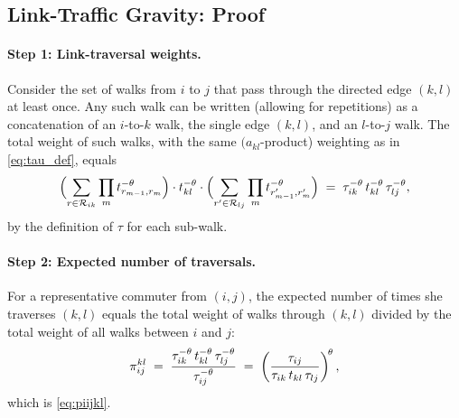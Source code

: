 \subsection{Link-Traffic Gravity: Proof}\label{app:linkgravity}

\paragraph{Step 1: Link-traversal weights.}
Consider the set of walks from $i$ to $j$ that pass through the
directed edge $(k,l)$ at least once.  Any such walk can be written
(allowing for repetitions) as a concatenation of an $i$-to-$k$ walk,
the single edge $(k,l)$, and an $l$-to-$j$ walk.  The total weight of
such walks, with the same $(a_{kl}$-product) weighting as in
\eqref{eq:tau_def}, equals
\[
  \Bigl(\sum_{r\in\mathcal R_{ik}}\prod_{m}t_{r_{m-1},r_m}^{-\theta}\Bigr)\cdot
  t_{kl}^{-\theta}\cdot
  \Bigl(\sum_{r'\in\mathcal R_{lj}}\prod_{m}t_{r'_{m-1},r'_m}^{-\theta}\Bigr)
  \;=\;\tau_{ik}^{-\theta}\,t_{kl}^{-\theta}\,\tau_{lj}^{-\theta},
\]
by the definition of $\tau$ for each sub-walk.

\paragraph{Step 2: Expected number of traversals.}
For a representative commuter from $(i,j)$, the expected number of
times she traverses $(k,l)$ equals the total weight of walks through
$(k,l)$ divided by the total weight of all walks between $i$ and $j$:
\begin{equation}
  \pi^{kl}_{ij}
  \;=\;\frac{\tau_{ik}^{-\theta}\,t_{kl}^{-\theta}\,\tau_{lj}^{-\theta}}
            {\tau_{ij}^{-\theta}}
  \;=\;\left(\frac{\tau_{ij}}{\tau_{ik}\,t_{kl}\,\tau_{lj}}\right)^{\!\theta},
  \label{eq:piijkl_app}
\end{equation}
which is \eqref{eq:piijkl}.

